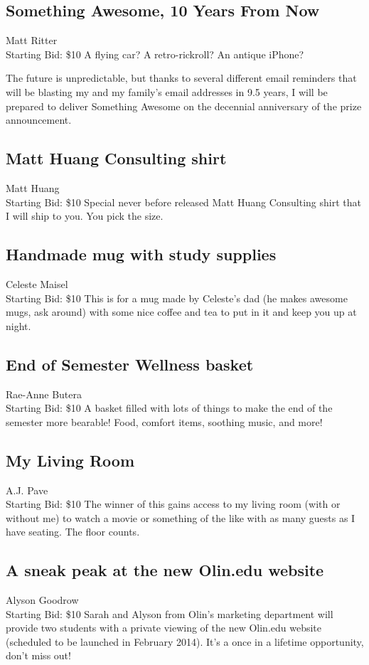 \documentclass[11pt]{article}
\begin{document}
\subsection{ Something Awesome, 10 Years From Now}
Matt Ritter
\\
Starting Bid: \$10
\newline
A flying car? A retro-rickroll? An antique iPhone?

The future is unpredictable, but thanks to several different email reminders that will be blasting my and my family's email addresses in 9.5 years, I will be prepared to deliver Something Awesome on the decennial anniversary of the prize announcement.
\subsection{Matt Huang Consulting shirt}
Matt Huang
\\
Starting Bid: \$10
\newline
Special never before released Matt Huang Consulting shirt that I will ship to you. You pick the size.
\subsection{Handmade mug with study supplies}
Celeste Maisel
\\
Starting Bid: \$10
\newline
This is for a mug made by Celeste's dad (he makes awesome mugs, ask around) with some nice coffee and tea to put in it and keep you up at night.
\subsection{End of Semester Wellness basket}
Rae-Anne Butera
\\
Starting Bid: \$10
\newline
A basket filled with lots of things to make the end of the semester more bearable! Food, comfort items, soothing music, and more!
\subsection{My Living Room}
A.J. Pave
\\
Starting Bid: \$10
\newline
The winner of this gains access to my living room (with or without me) to watch a movie or something of the like with as many guests as I have seating. The floor counts.
\subsection{A sneak peak at the new Olin.edu website}
Alyson Goodrow
\\
Starting Bid: \$10
\newline
Sarah and Alyson from Olin's marketing department will provide two students with a private viewing of the new Olin.edu website (scheduled to be launched in February 2014). It's a once in a lifetime opportunity, don't miss out!
\end{document}
